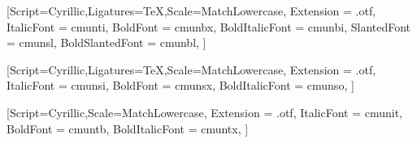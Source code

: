 
\setmainfont[Ligatures=TeX,Scale=MatchLowercase]{CMU Serif}
\setsansfont[Ligatures=TeX,Scale=MatchLowercase]{CMU Sans Serif}
\setmonofont[Scale=MatchLowercase]{CMU Typewriter Text}

\newfontfamily{}%
[Script=Cyrillic,Ligatures=TeX,Scale=MatchLowercase,%
Extension = .otf,%
ItalicFont = cmunti,%
BoldFont = cmunbx,%
BoldItalicFont = cmunbi,%
SlantedFont = cmunsl,%
BoldSlantedFont = cmunbl,%
]

\newfontfamily{}%
[Script=Cyrillic,Ligatures=TeX,Scale=MatchLowercase,%
Extension = .otf,%
ItalicFont = cmunsi,%
BoldFont = cmunsx,%
BoldItalicFont = cmunso,%
]

\newfontfamily{}%
[Script=Cyrillic,Scale=MatchLowercase,%
Extension = .otf,%
ItalicFont = cmunit,%
BoldFont = cmuntb,%
BoldItalicFont = cmuntx,%
]


